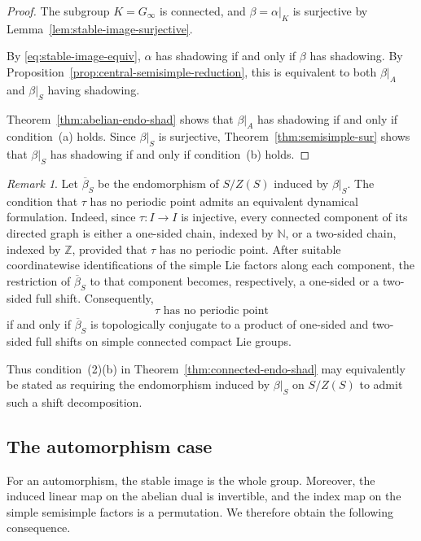 \documentclass[12pt]{amsart}
\theoremstyle{definition}
\numberwithin{equation}{section}
\theoremstyle{remark}
\newtheorem{remark}[theorem]{Remark}
\begin{document}
\begin{proof}The subgroup $K=G_\infty$ is connected, and
	$\beta=\alpha|_K$ is surjective by
	Lemma~\ref{lem:stable-image-surjective}.
	
By \eqref{eq:stable-image-equiv}, $\alpha$ has shadowing if and
only if $\beta$ has shadowing. By
Proposition~\ref{prop:central-semisimple-reduction}, this is equivalent
to both $\beta|_A$ and $\beta|_S$ having shadowing.

Theorem~\ref{thm:abelian-endo-shad} shows that $\beta|_A$ has
shadowing if and only if condition~(a) holds. Since $\beta|_S$ is
surjective, Theorem~\ref{thm:semisimple-sur} shows
that $\beta|_S$ has shadowing if and only if condition~(b) holds.
\end{proof}


\begin{remark}
Let $\overline\beta_S$ be the endomorphism of $S/Z(S)$ induced by
$\beta|_S$. The condition that $\tau$ has no periodic point admits an
equivalent dynamical formulation. Indeed, since $\tau:I\to I$ is
injective, every connected component of its directed graph is either
a one-sided chain, indexed by $\mathbb N$, or a two-sided chain,
indexed by $\mathbb Z$, provided that $\tau$ has no periodic point.
After suitable coordinatewise identifications of the simple Lie
factors along each component, the restriction of
$\overline\beta_S$ to that component becomes, respectively, a
one-sided or a two-sided full shift. Consequently,
\[
\tau\text{ has no periodic point}
\]
if and only if $\overline\beta_S$ is topologically conjugate to a
product of one-sided and two-sided full shifts on simple connected compact Lie groups.

Thus condition~{\rm(2)(b)} in
Theorem~\ref{thm:connected-endo-shad} may equivalently be stated as
requiring the endomorphism induced by $\beta|_S$ on $S/Z(S)$ to admit
such a shift decomposition.
\end{remark}


\subsection{The automorphism case}

For an automorphism, the stable image is the whole group. Moreover,
the induced linear map on the abelian dual is invertible, and the
index map on the simple semisimple factors is a permutation. We
therefore obtain the following consequence.
\end{document}
